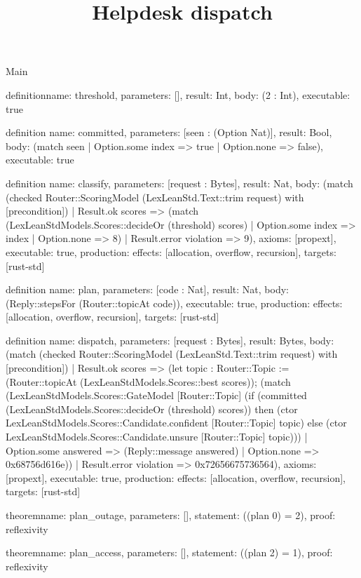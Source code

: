 \begin{lexlean}{Main}
\title{Helpdesk dispatch}
\begin{semanticmodule}
definition{name: threshold, parameters: [], result: Int, body: (2 : Int), executable: true}

definition{
  name: committed,
  parameters: [seen : (Option Nat)],
  result: Bool,
  body: (match seen | Option.some index => true | Option.none => false),
  executable: true
}

definition{
  name: classify,
  parameters: [request : Bytes],
  result: Nat,
  body: (match (checked Router::ScoringModel (LexLeanStd.Text::trim request) with [precondition])
    | Result.ok scores => (match (LexLeanStdModels.Scores::decideOr (threshold) scores)
      | Option.some index => index
      | Option.none => 8)
    | Result.error violation => 9),
  axioms: [propext],
  executable: true,
  production: {effects: [allocation, overflow, recursion], targets: [rust-std]}
}

definition{
  name: plan,
  parameters: [code : Nat],
  result: Nat,
  body: (Reply::stepsFor (Router::topicAt code)),
  executable: true,
  production: {effects: [allocation, overflow, recursion], targets: [rust-std]}
}

definition{
  name: dispatch,
  parameters: [request : Bytes],
  result: Bytes,
  body: (match (checked Router::ScoringModel (LexLeanStd.Text::trim request) with [precondition])
    | Result.ok scores => (let topic : Router::Topic := (Router::topicAt (LexLeanStdModels.Scores::best scores)); (match (LexLeanStdModels.Scores::GateModel [Router::Topic] (if (committed (LexLeanStdModels.Scores::decideOr (threshold) scores)) then (ctor LexLeanStdModels.Scores::Candidate.confident [Router::Topic] topic) else (ctor LexLeanStdModels.Scores::Candidate.unsure [Router::Topic] topic)))
      | Option.some answered => (Reply::message answered)
      | Option.none => 0x68756d616e))
    | Result.error violation => 0x72656675736564),
  axioms: [propext],
  executable: true,
  production: {effects: [allocation, overflow, recursion], targets: [rust-std]}
}

theorem{name: plan_outage, parameters: [], statement: ((plan 0) = 2), proof: reflexivity{}}

theorem{name: plan_access, parameters: [], statement: ((plan 2) = 1), proof: reflexivity{}}
\end{semanticmodule}
\end{lexlean}
